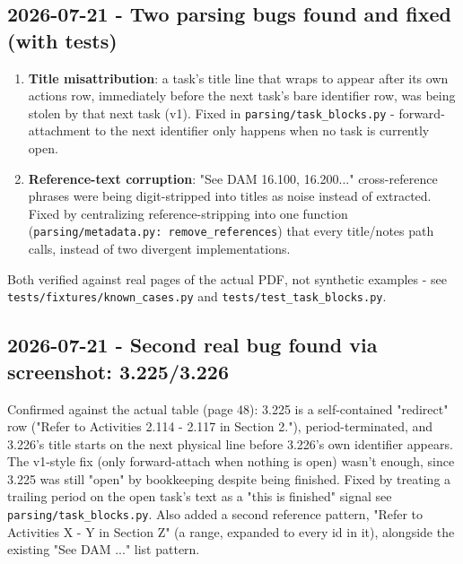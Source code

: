 \subsection*{2026-07-21 - Two parsing bugs found and fixed (with tests)}
\begin{enumerate}
\item \textbf{Title misattribution}: a task's title line that wraps to appear after its own actions row, immediately before the next task's bare identifier row, was being stolen by that next task (v1). Fixed in \texttt{parsing/\allowbreak{}task\_\allowbreak{}blocks.py} - forward-attachment to the next identifier only happens when no task is currently open.
\item \textbf{Reference-text corruption}: "See DAM 16.100, 16.200..." cross-reference phrases were being digit-stripped into titles as noise instead of extracted. Fixed by centralizing reference-stripping into one function (\texttt{parsing/\allowbreak{}metadata.py: remove\_\allowbreak{}references}) that every title/notes path calls, instead of two divergent implementations.
\end{enumerate}
Both verified against real pages of the actual PDF, not synthetic examples - see \texttt{tests/\allowbreak{}fixtures/\allowbreak{}known\_\allowbreak{}cases.py} and \texttt{tests/\allowbreak{}test\_\allowbreak{}task\_\allowbreak{}blocks.py}.

\subsection*{2026-07-21 - Second real bug found via screenshot: 3.225/3.226}
Confirmed against the actual table (page 48): 3.225 is a self-contained "redirect" row ("Refer to Activities 2.114 - 2.117 in Section 2."), period-terminated, and 3.226's title starts on the next physical line before 3.226's own identifier appears. The v1-style fix (only forward-attach when nothing is open) wasn't enough, since 3.225 was still "open" by bookkeeping despite being finished. Fixed by treating a trailing period on the open task's text as a "this is finished" signal see \texttt{parsing/\allowbreak{}task\_\allowbreak{}blocks.py}. Also added a second reference pattern, "Refer to Activities X - Y in Section Z" (a range, expanded to every id in it), alongside the existing "See DAM ..." list pattern.

